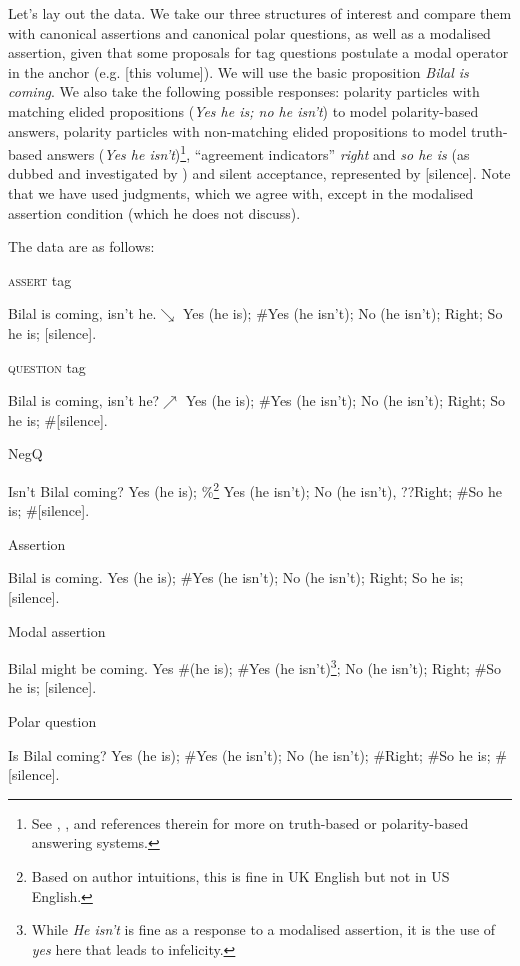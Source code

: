 \documentclass[output=paper,colorlinks,citecolor=brown]{langscibook}
\begin{document}
Let's lay out the data. We take our three structures of interest and compare them with canonical assertions and canonical polar questions, as well as a modalised assertion, given that some proposals for tag questions postulate a modal operator in the anchor (e.g. \citealt{billkoevvol} [this volume]). We will use the basic proposition \textit{Bilal is coming}. We also take the following possible responses: polarity particles with matching elided propositions (\textit{Yes he is; no he isn't}) to model polarity-based answers, polarity particles with non-matching elided propositions to model truth-based answers (\textit{Yes he isn't})\footnote{See \citet[Chapter 4.1]{holmberg2016}, \citet{jones1999}, and references therein for more on truth-based or polarity-based answering systems.},  ``agreement indicators'' \textit{right} and \textit{so he is} (as dubbed and investigated by \citealt{holmberg2016}) and silent acceptance, represented by [silence]. Note that we have used  judgments, which we agree with, except in the modalised assertion condition (which he does not discuss).

The data are as follows:

\begin{exe}
\ex \textsc{assert} tag \label{response:asserttag}
   \begin{xlist} 
   Bilal is coming, isn't he.$\searrow$ 
  Yes (he is); \#Yes (he isn't); No (he isn't); Right; So he is; [silence].
  \end{xlist} 
\ex  \textsc{question} tag
\begin{xlist} 
   Bilal is coming, isn't he?$\nearrow$
 Yes (he is); \#Yes (he isn't); No (he isn't); Right; So he is; \#[silence].
\end{xlist} 
\ex NegQ
  \begin{xlist}
   Isn't Bilal coming? 
 Yes (he is); \%\footnote{Based on author intuitions, this is fine in UK English but not in US English.} Yes (he isn't);  No (he isn't), ??Right; \#So he is; \#[silence].
\end{xlist} 
\ex Assertion
  \begin{xlist}
         Bilal is coming.
 	Yes (he is); \#Yes (he isn't); No (he isn't); Right; So he is; [silence].
  \end{xlist} 
\ex Modal assertion
    \begin{xlist}
  Bilal might be coming.
 	Yes \#(he is); \#Yes (he isn't)\footnote{While \textit{He isn't} is fine as a response to a modalised assertion, it is the use of \textit{yes} here that leads to infelicity.}; No (he isn't); Right; \#So he is; [silence].
  \end{xlist} 
\ex Polar question \label{response:polar}
      \begin{xlist}
  Is Bilal coming?
 Yes (he is); \#Yes (he isn't); No (he isn't); \#Right; \#So he is; \#[silence].
\end{xlist} 
\end{exe}
\end{document}

